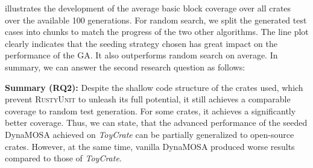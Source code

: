\documentclass[paper=a4,%
  twoside,%
  BCOR4mm,%
  abstract=true,%
  toc=bibliography,%
  chapterprefix=true,%
  toc=bibliographynumbered,%
  open=right,%
  english,%
  pagesize=pdftex]{scrreprt}
\newcommand{\tech}{\textsc{RustyUnit}\xspace}
\newcommand{\ga}{\ac{GA}\xspace}
\newcommand{\todo}[1]{\textbf{TODO: #1}}
\newcommand{\toycrate}{\emph{ToyCrate}\xspace}
\begin{document}
 illustrates the development of the average basic block coverage over all crates over the available 100 generations. For random search, we split the generated test cases into chunks to match the progress of the two other algorithms. The line plot clearly indicates that the seeding strategy chosen has great impact on the performance of the \ga. It also outperforms random search on average. In summary, we can answer the second research question as follows:

\noindent\begin{tcolorbox}
\textbf{Summary (RQ2):} Despite the shallow code structure of the crates used, which prevent \tech to unleash its full potential, it still achieves a comparable coverage to random test generation. For some crates, it achieves a significantly better coverage. Thus, we can state, that the advanced performance of the seeded DynaMOSA achieved on \toycrate can be partially generalized to open-source crates. However, at the same time, vanilla DynaMOSA produced worse results compared to those of \toycrate.
\end{tcolorbox}
\end{document}
